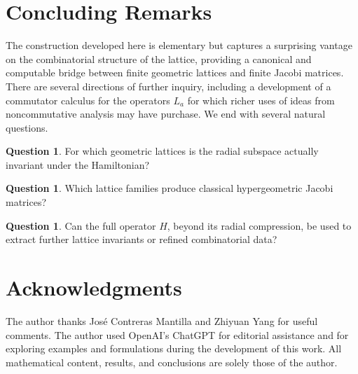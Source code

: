 \documentclass[11pt]{amsart}
\theoremstyle{definition}
\newtheorem{question}[thm]{Question}
\begin{document}
\section{Concluding Remarks}

The construction developed here is elementary but captures a surprising vantage on the combinatorial structure of the lattice,  providing a canonical and computable bridge between finite geometric lattices and finite Jacobi matrices. There are several directions of further inquiry, including a development of a commutator calculus for the operators $L_a$ for which richer uses of ideas from noncommutative analysis may have purchase. We end with several natural questions.

\begin{question}
For which geometric lattices is the radial subspace actually invariant under the Hamiltonian?
\end{question}

\begin{question}
Which lattice families produce classical hypergeometric Jacobi matrices?
\end{question}

\begin{question}
Can the full operator $H$, beyond its radial compression, be used to extract further lattice invariants or refined combinatorial data?
\end{question}


\section*{Acknowledgments}
The author thanks Jos\'e Contreras Mantilla and Zhiyuan Yang for useful comments. 
The author used OpenAI’s ChatGPT for editorial assistance and for exploring examples and formulations during the development of this work. All mathematical content, results, and conclusions are solely those of the author.
\end{document}
